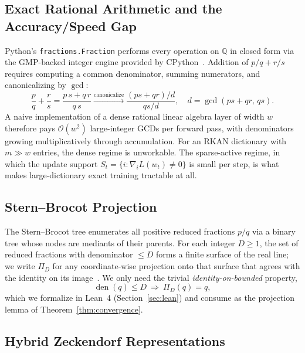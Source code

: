 \documentclass[11pt,a4paper]{article}
\begin{document}
\subsection{Exact Rational Arithmetic and the Accuracy/Speed Gap}

Python's \texttt{fractions.Fraction} performs every operation on
$\mathbb{Q}$ in closed form via the GMP-backed integer engine provided by
CPython~\cite{gmplib}. Addition of $p/q + r/s$ requires computing a common
denominator, summing numerators, and canonicalizing by $\gcd$:
\begin{equation}
\frac{p}{q} + \frac{r}{s} = \frac{p\,s + q\,r}{q\,s} \xrightarrow{\mathrm{canonicalize}} \frac{(p s + q r)/d}{qs/d}, \quad d = \gcd(p s + q r,\, q s).
\label{eq:fraction_add}
\end{equation}
A naive implementation of a dense rational linear algebra layer of width
$w$ therefore pays $\mathcal{O}(w^{2})$ large-integer GCDs per forward
pass, with denominators growing multiplicatively through accumulation.
For an RKAN dictionary with $m \gg w$ entries, the dense regime is
unworkable. The sparse-active regime, in which the update support
$S_{t} = \{i : \nabla_{i} L(w_{t}) \neq 0\}$ is small per step, is what
makes large-dictionary exact training tractable at all.

\subsection{Stern--Brocot Projection}

The Stern--Brocot tree enumerates all positive reduced fractions
$p/q$ via a binary tree whose nodes are mediants of their parents.
For each integer $D \geq 1$, the set of reduced fractions with denominator
$\leq D$ forms a finite surface of the real line; we write $\Pi_{D}$
for any coordinate-wise projection onto that surface that agrees with the
identity on its image~\cite{stern1858,brocot1861,graham1989concrete}.
We only need the trivial \emph{identity-on-bounded} property,
\begin{equation}
\operatorname{den}(q) \leq D \ \Longrightarrow\ \Pi_{D}(q) = q,
\label{eq:sb_idem}
\end{equation}
which we formalize in Lean~4 (Section~\ref{sec:lean}) and consume as the
projection lemma of Theorem~\ref{thm:convergence}.

\subsection{Hybrid Zeckendorf Representations}
\end{document}
